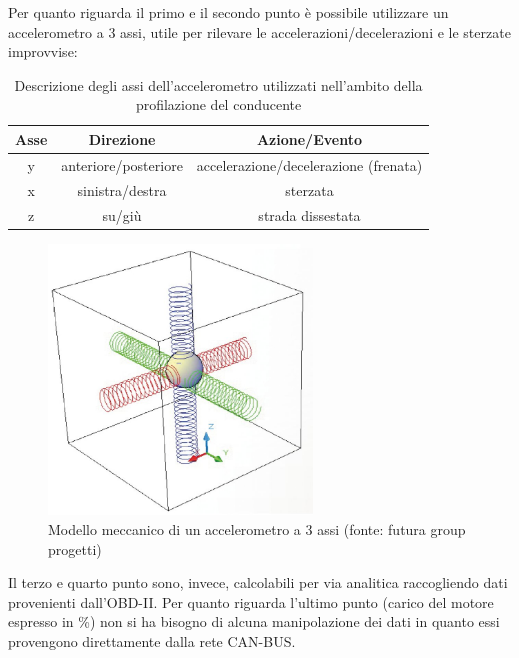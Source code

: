 \documentclass[12pt, a4paper, italian]{report}
\numberwithin{figure}{chapter}
\numberwithin{table}{chapter}
\begin{document}
Per quanto riguarda il primo e il secondo punto è possibile utilizzare un accelerometro a 3 assi, utile per rilevare  le accelerazioni/decelerazioni e le sterzate improvvise: 

\begin{table}[h!]
  \centering
  \begin{tabular}{|c|c|c|}
    \hline
    \textbf{Asse} & \textbf{Direzione} & \textbf{Azione/Evento} \\
    \hline
    y & anteriore/posteriore & accelerazione/decelerazione (frenata) \\
    \hline
    x & sinistra/destra & sterzata \\
    \hline
    z & su/giù & strada dissestata \\
    \hline
  \end{tabular}
  \caption{Descrizione degli assi dell'accelerometro utilizzati nell'ambito della profilazione del conducente \cite{mpu6050_datasheet}}
  \label{tab:tabellaAccelerometro}
\end{table}

\begin{figure}[h]
  \centering
  \includegraphics[width=7cm]{Accelerometro.jpg}
  \caption{Modello meccanico di un accelerometro a 3 assi \protect\footnotemark (fonte: futura group progetti)}
  \label{fig:accelerometro}
\end{figure} %

Il terzo e quarto punto sono, invece, calcolabili per via analitica raccogliendo dati provenienti dall'OBD-II. Per quanto riguarda l'ultimo punto (carico del motore espresso in \%) non si ha bisogno di alcuna manipolazione dei dati in quanto essi provengono direttamente dalla rete CAN-BUS.
\end{document}

